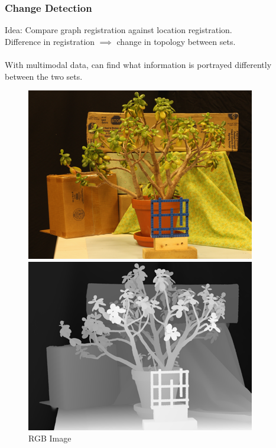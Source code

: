 \documentclass{beamer}
\begin{document}
\begin{frame}
  \frametitle{Change Detection}
  Idea: Compare graph registration against location registration.\\
  Difference in registration $\implies$ change in topology between sets.\\~\\
  With multimodal data, can find what information is portrayed differently between the two sets.
  \begin{figure}[ht]
    \begin{minipage}[b]{0.3\linewidth}
      \centering
      \includegraphics[width=\textwidth]{./JadePlant/pictureX.png}
      \caption{RGB Image}
    \end{minipage}
    \begin{minipage}[b]{0.3\linewidth}
      \centering
      \includegraphics[width=\textwidth]{./JadePlant/pictureY.png}

\end{minipage}
\end{figure}
\end{frame}
\end{document}
